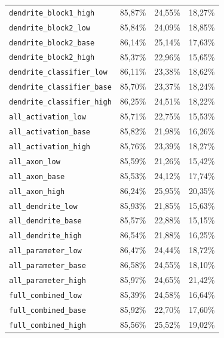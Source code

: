 \documentclass[a4paper]{article}
\begin{document}
\begin{longtable}{p{5.6cm}rrr}
\texttt{dendrite\_block1\_high} & 85{,}87\% & 24{,}55\% & 18{,}27\%\\
\texttt{dendrite\_block2\_low} & 85{,}84\% & 24{,}09\% & 18{,}85\%\\
\texttt{dendrite\_block2\_base} & 86{,}14\% & 25{,}14\% & 17{,}63\%\\
\texttt{dendrite\_block2\_high} & 85{,}37\% & 22{,}96\% & 15{,}65\%\\
\texttt{dendrite\_classifier\_low} & 86{,}11\% & 23{,}38\% & 18{,}62\%\\
\texttt{dendrite\_classifier\_base} & 85{,}70\% & 23{,}37\% & 18{,}24\%\\
\texttt{dendrite\_classifier\_high} & 86{,}25\% & 24{,}51\% & 18{,}22\%\\
\texttt{all\_activation\_low} & 85{,}71\% & 22{,}75\% & 15{,}53\%\\
\texttt{all\_activation\_base} & 85{,}82\% & 21{,}98\% & 16{,}26\%\\
\texttt{all\_activation\_high} & 85{,}76\% & 23{,}39\% & 18{,}27\%\\
\texttt{all\_axon\_low} & 85{,}59\% & 21{,}26\% & 15{,}42\%\\
\texttt{all\_axon\_base} & 85{,}53\% & 24{,}12\% & 17{,}74\%\\
\texttt{all\_axon\_high} & 86{,}24\% & 25{,}95\% & 20{,}35\%\\
\texttt{all\_dendrite\_low} & 85{,}93\% & 21{,}85\% & 15{,}63\%\\
\texttt{all\_dendrite\_base} & 85{,}57\% & 22{,}88\% & 15{,}15\%\\
\texttt{all\_dendrite\_high} & 86{,}54\% & 21{,}88\% & 16{,}25\%\\
\texttt{all\_parameter\_low} & 86{,}47\% & 24{,}44\% & 18{,}72\%\\
\texttt{all\_parameter\_base} & 86{,}58\% & 24{,}55\% & 18{,}10\%\\
\texttt{all\_parameter\_high} & 85{,}97\% & 24{,}65\% & 21{,}42\%\\
\texttt{full\_combined\_low} & 85{,}39\% & 24{,}58\% & 16{,}64\%\\
\texttt{full\_combined\_base} & 85{,}92\% & 22{,}70\% & 17{,}60\%\\
\texttt{full\_combined\_high} & 85{,}56\% & 25{,}52\% & 19{,}02\%\\
\bottomrule
\end{longtable}
\end{document}
